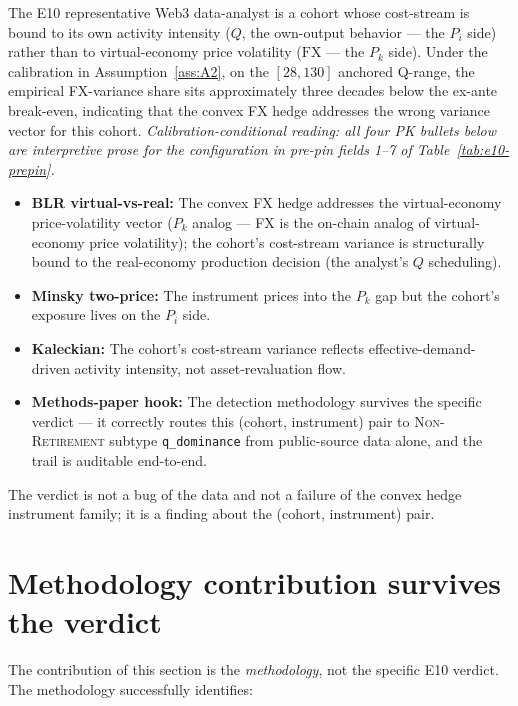 \documentclass[11pt,letterpaper]{article}
\newcommand{\Cfx}{\mathrm{FX}}
\theoremstyle{assumption}
\begin{document}
The E10 representative Web3 data-analyst is a cohort whose cost-stream is
bound to its own activity intensity ($Q$, the own-output behavior --- the
$P_i$ side) rather than to virtual-economy price volatility ($\Cfx$ --- the
$P_k$ side). Under the calibration in Assumption~\ref{ass:A2}, on the
$[28, 130]$ anchored Q-range, the empirical FX-variance share sits
approximately three decades below the ex-ante break-even, indicating that
the convex FX hedge addresses the wrong variance vector for this cohort.
\emph{Calibration-conditional reading: all four PK bullets below are
interpretive prose for the configuration in pre-pin fields 1--7 of
Table~\ref{tab:e10-prepin}.}

\begin{itemize}
\item \textbf{BLR virtual-vs-real:} The convex FX hedge addresses the
  virtual-economy price-volatility vector ($P_k$ analog --- FX is the
  on-chain analog of virtual-economy price volatility); the cohort's
  cost-stream variance is structurally bound to the real-economy
  production decision (the analyst's $Q$ scheduling).
\item \textbf{Minsky two-price:} The instrument prices into the $P_k$ gap
  but the cohort's exposure lives on the $P_i$ side.
\item \textbf{Kaleckian:} The cohort's cost-stream variance reflects
  effective-demand-driven activity intensity, not asset-revaluation flow.
\item \textbf{Methods-paper hook:} The detection methodology survives the
  specific verdict --- it correctly routes this (cohort, instrument) pair
  to \textsc{Non-Retirement} subtype \texttt{q\_dominance} from
  public-source data alone, and the trail is auditable end-to-end.
\end{itemize}

The verdict is not a bug of the data and not a failure of the convex hedge
instrument family; it is a finding about the (cohort, instrument) pair.

\section{Methodology contribution survives the verdict}
\label{sec:e10-contribution}

The contribution of this section is the \emph{methodology}, not the
specific E10 verdict. The methodology successfully identifies:
\end{document}
